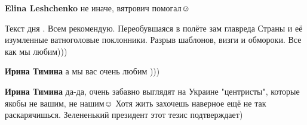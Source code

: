 \begin{itemize}
\textbf{Elina Leshchenko} не иначе, вятрович помогал☺️

 

Текст дня . Всем рекомендую. Переобувшаяся в полёте зам главреда Страны и её
изумленные ватноголовые поклонники. Разрыв шаблонов, визги и обмороки. Все как
мы любим)))


\begin{itemize}
 
\textbf{Ирина Тимина} а мы вас очень любим )))

 
\textbf{Ирина Тимина} да-да, очень забавно выглядят на Украине "центристы", которые якобы не вашим, не нашим☺️ Хотя жить захочешь наверное ещё не так раскарячишься. Зелененький президент этот тезис подтверждает)
\end{itemize}

\end{itemize}

